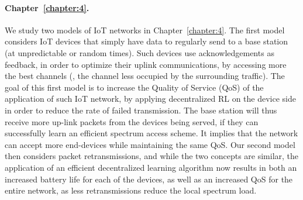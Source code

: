 \paragraph{Chapter~\ref{chapter:4}.}
%
We study two models of IoT networks in Chapter~\ref{chapter:4}.
The first model considers IoT devices that simply have data to regularly send to a base station (at unpredictable or random times).
Such devices use acknowledgements as feedback, in order to optimize their uplink communications, by accessing more the best channels (\ie, the channel less occupied by the surrounding traffic).
The goal of this first model is to increase the Quality of Service (QoS) of the application of such IoT network, by applying decentralized RL on the device side in order to reduce the rate of failed transmission.
The base station will thus receive more up-link packets from the devices being served, if they can successfully learn an efficient spectrum access scheme.
It implies that the network can accept more end-devices while maintaining the same QoS.
%
Our second model then considers packet retransmissions, and while the two concepts are similar, the application of an efficient decentralized learning algorithm now results in both an increased battery life for each of the devices, as well as an increased QoS for the entire network, as less retransmissions reduce the local spectrum load.


